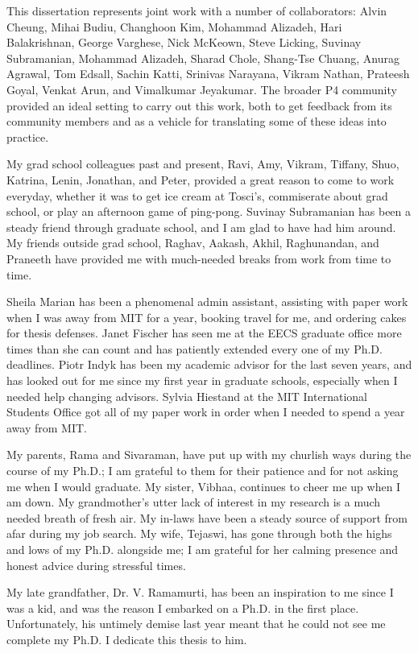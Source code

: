 This dissertation represents joint work with a number of collaborators: Alvin
Cheung, Mihai Budiu, Changhoon Kim, Mohammad Alizadeh, Hari Balakrishnan,
George Varghese, Nick McKeown, Steve Licking, Suvinay Subramanian, Mohammad
Alizadeh, Sharad Chole, Shang-Tse Chuang, Anurag Agrawal, Tom Edsall, Sachin
Katti, Srinivas Narayana, Vikram Nathan, Prateesh Goyal, Venkat Arun, and
Vimalkumar Jeyakumar. The broader P4 community provided an ideal setting to
carry out this work, both to get feedback from its community members and as a
vehicle for translating some of these ideas into practice. 

My grad school colleagues past and present, Ravi, Amy, Vikram, Tiffany, Shuo,
Katrina, Lenin, Jonathan, and Peter, provided a great reason to come to work
everyday, whether it was to get ice cream at Tosci's, commiserate about grad
school, or play an afternoon game of ping-pong.  Suvinay Subramanian has been a
steady friend through graduate school, and I am glad to have had him around. My
friends outside grad school, Raghav, Aakash, Akhil, Raghunandan, and Praneeth
have provided me with much-needed breaks from work from time to time.

Sheila Marian has been a phenomenal admin assistant, assisting with paper work
when I was away from MIT for a year, booking travel for me, and ordering cakes
for thesis defenses. Janet Fischer has seen me at the EECS graduate office more
times than she can count and has patiently extended every one of my Ph.D.
deadlines. Piotr Indyk has been my academic advisor for the last seven years,
and has looked out for me since my first year in graduate schools, especially
when I needed help changing advisors. Sylvia Hiestand at the MIT International
Students Office got all of my paper work in order when I needed to spend a year
away from MIT.

My parents, Rama and Sivaraman, have put up with my churlish ways during the
course of my Ph.D.; I am grateful to them for their patience and for not asking
me when I would graduate. My sister, Vibhaa, continues to cheer me up when I am
down.  My grandmother's utter lack of interest in my research is a much needed
breath of fresh air. My in-laws have been a steady source of support from afar
during my job search. My wife, Tejaswi, has gone through both the highs and
lows of my Ph.D. alongside me; I am grateful for her calming presence and
honest advice during stressful times. 

My late grandfather, Dr. V. Ramamurti, has been an inspiration to me since I
was a kid, and was the reason I embarked on a Ph.D. in the first place.
Unfortunately, his untimely demise last year meant that he could not see me
complete my Ph.D. I dedicate this thesis to him.
